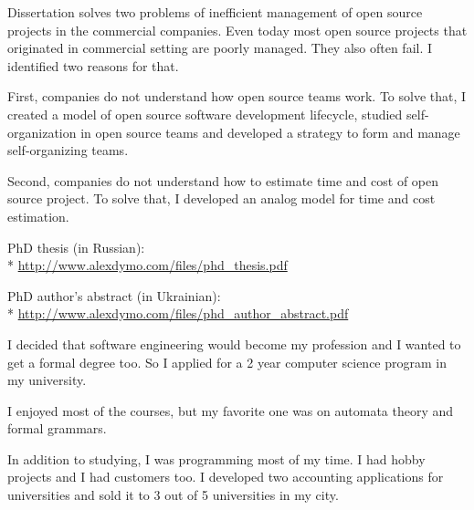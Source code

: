 \documentclass[12pt]{letter}
\begin{document}
\begin{llist}
            \item Dissertation solves two problems of inefficient management of open source projects in the commercial companies. Even today most open source projects that originated in commercial setting are poorly managed. They also often fail. I identified two reasons for that.

            \item First, companies do not understand how open source teams work. To solve that, I created a model of open source software development lifecycle, studied self-organization in open source teams and developed a strategy to form and manage self-organizing teams.

            \item Second, companies do not understand how to estimate time and cost of open source project. To solve that, I developed an analog model for time and cost estimation.

            \item PhD thesis (in Russian):\\*
            \url{http://www.alexdymo.com/files/phd_thesis.pdf}
            \item PhD author's abstract (in Ukrainian):\\* \url{http://www.alexdymo.com/files/phd_author_abstract.pdf}

  \endexperience


  \startexperience

            \item I decided that software engineering would become my profession and I wanted to get a formal degree too. So I applied for a 2 year computer science program in my university.

            \item I enjoyed most of the courses, but my favorite one was on automata theory and formal grammars.

            \item In addition to studying, I was programming most of my time. I had hobby projects and I had customers too. I developed two accounting applications for universities and sold it to 3 out of 5 universities in my city.

  \endexperience



\end{llist}
\end{document}
